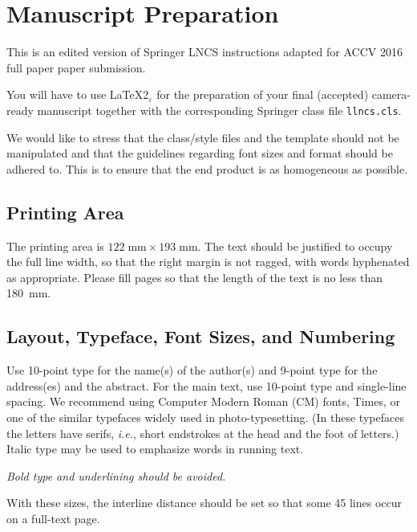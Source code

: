 \documentclass[runningheads]{llncs}
\begin{document}
\section{Manuscript Preparation}

This is an edited version of Springer LNCS instructions adapted for
ACCV 2016 full paper paper submission. 

You will have to use \LaTeX2$_\varepsilon$ for the
preparation of your final (accepted)
camera-ready manuscript together with the corresponding Springer
class file \verb+llncs.cls+.

We would like to stress that the class/style files and the template
should not be manipulated and that the guidelines regarding font sizes
and format should be adhered to. This is to ensure that the end product
is as homogeneous as possible.

\subsection{Printing Area}

The printing area is $122  \; \mbox{mm} \times 193 \;
\mbox{mm}$.
The text should be justified to occupy the full line width,
so that the right margin is not ragged, with words hyphenated as
appropriate. Please fill pages so that the length of the text
is no less than 180~mm.

\subsection{Layout, Typeface, Font Sizes, and Numbering}

Use 10-point type for the name(s) of the author(s) and 9-point type for
the address(es) and the abstract. For the main text, use 10-point
type and single-line spacing.
We recommend using Computer Modern Roman (CM) fonts, Times, or one
of the similar typefaces widely used in photo-typesetting.
(In these typefaces the letters have serifs, {\it i.e.}, short endstrokes at
the head and the foot of letters.)
Italic type may be used to emphasize words in running text. 

{\it Bold type and underlining should be avoided.}

With these sizes, the interline distance should be set so that some 45
lines occur on a full-text page.

\end{document}
